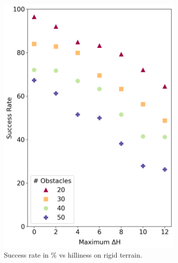 \begin{figure}
    \captionsetup{justification=centering}
    \centering
    \begin{subfigure}{0.36\textwidth}
        \includegraphics[height=.25\paperheight]{images/demonstration/rigid_height_success_rate.png}
        \caption{Success rate in \% vs hilliness on rigid terrain.}
        \label{fig:rigid_height_success}
    \end{subfigure}%
    \hfill
    \begin{subfigure}{0.44\textwidth}

\end{subfigure}
\end{figure}
